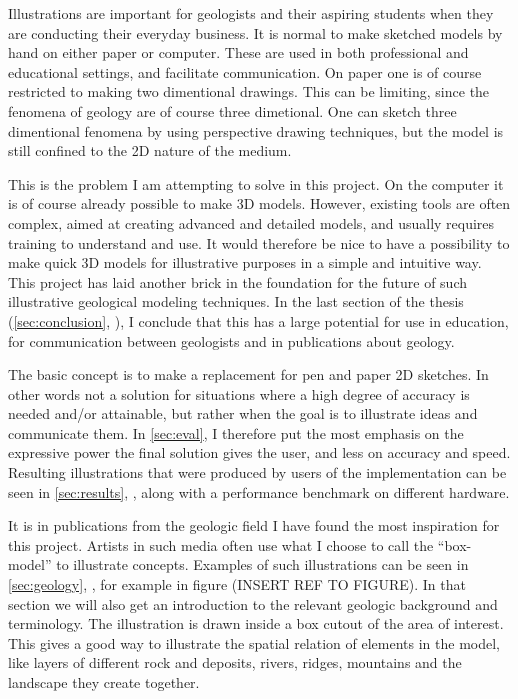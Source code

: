 \documentclass[a4paper,12pt]{article}
\newcommand{\secref}[1]{\autoref{#1}, \nameref{#1}}
\begin{document}
	
Illustrations are important for geologists and their aspiring students when they are conducting their everyday business. It is normal to make sketched models by hand on either paper or computer. These are used in both professional and educational settings, and facilitate communication. On paper one is of course restricted to making two dimentional drawings. This can be limiting, since the fenomena of geology are of course three dimetional. One can sketch three dimentional fenomena by using perspective drawing techniques, but the model is still confined to the 2D nature of the medium.

This is the problem I am attempting to solve in this project. On the computer it is of course already possible to make 3D models. However, existing tools are often complex, aimed at creating advanced and detailed models, and usually requires training to understand and use. It would therefore be nice to have a possibility to make quick 3D models for illustrative purposes in a simple and intuitive way. This project has laid another brick in the foundation for the future of such illustrative geological modeling techniques. In the last section of the thesis (\secref{sec:conclusion}), I conclude that this has a large potential for use in education, for communication between geologists and in publications about geology.

The basic concept is to make a replacement for pen and paper 2D sketches. In other words not a solution for situations where a high degree of accuracy is needed and/or attainable, but rather when the goal is to illustrate ideas and communicate them. In \secref{sec:eval} I therefore put the most emphasis on the expressive power the final solution gives the user, and less on accuracy and speed. Resulting illustrations that were produced by users of the implementation can be seen in \secref{sec:results}, along with a performance benchmark on different hardware.

It is in publications from the geologic field I have found the most inspiration for this project. Artists in such media often use what I choose to call the ``box-model'' to illustrate concepts. Examples of such illustrations can be seen in \secref{sec:geology}, for example in figure (INSERT REF TO FIGURE). In that section we will also get an introduction to the relevant geologic background and terminology. The illustration is drawn inside a box cutout of the area of interest. This gives a good way to illustrate the spatial relation of elements in the model, like layers of different rock and deposits, rivers, ridges, mountains and the landscape they create together. 
\end{document}
